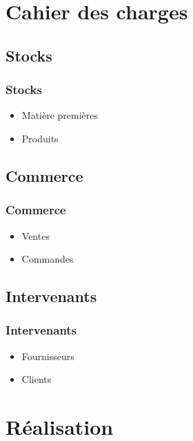     \section{Cahier des charges}

\subsection{Stocks}
\begin{frame}
\frametitle{Stocks}
\begin{itemize}
    \itemsep2em
    \item Matière premières
    \item Produits
\end{itemize}
\end{frame}

\subsection{Commerce}  %
\begin{frame}
\frametitle{Commerce}
\begin{itemize}
    \itemsep2em
    \item Ventes
    \item Commandes
\end{itemize}
\end{frame}

\subsection{Intervenants}
\begin{frame}
\frametitle{Intervenants}
\begin{itemize}
    \itemsep2em
    \item Fournisseurs
    \item Clients
\end{itemize}
\end{frame}


    \section{Réalisation}


